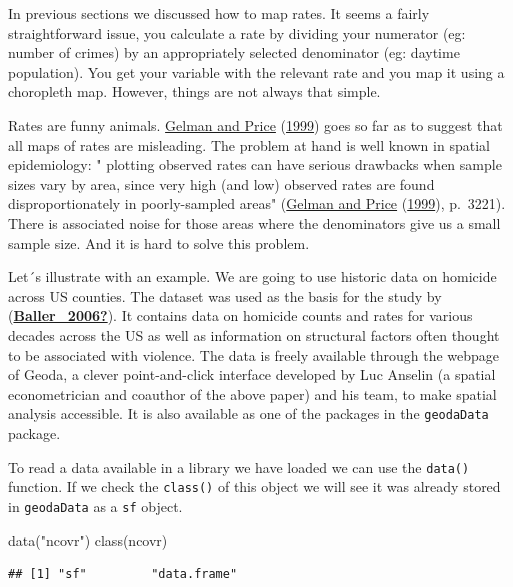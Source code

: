 \documentclass[
]{book}
\newenvironment{Shaded}{\begin{snugshade}}{\end{snugshade}}
\newcommand{\FunctionTok}[1]{\textcolor[rgb]{0.00,0.00,0.00}{#1}}
\newcommand{\NormalTok}[1]{#1}
\newcommand{\StringTok}[1]{\textcolor[rgb]{0.31,0.60,0.02}{#1}}
\begin{document}
In previous sections we discussed how to map rates. It seems a fairly straightforward issue, you calculate a rate by dividing your numerator (eg: number of crimes) by an appropriately selected denominator (eg: daytime population). You get your variable with the relevant rate and you map it using a choropleth map. However, things are not always that simple.

Rates are funny animals. \protect\hyperlink{ref-Gelman_1999}{Gelman and Price} (\protect\hyperlink{ref-Gelman_1999}{1999}) goes so far as to suggest that all maps of rates are misleading. The problem at hand is well known in spatial epidemiology: " plotting observed rates can have serious drawbacks when sample sizes vary by area, since very high (and low) observed rates are found disproportionately in poorly-sampled areas" (\protect\hyperlink{ref-Gelman_1999}{Gelman and Price} (\protect\hyperlink{ref-Gelman_1999}{1999}), p.~3221). There is associated noise for those areas where the denominators give us a small sample size. And it is hard to solve this problem.

Let´s illustrate with an example. We are going to use historic data on homicide across US counties. The dataset was used as the basis for the study by (\protect\hyperlink{ref-Baller_2006}{\textbf{Baller\_2006?}}). It contains data on homicide counts and rates for various decades across the US as well as information on structural factors often thought to be associated with violence. The data is freely available through the webpage of Geoda, a clever point-and-click interface developed by Luc Anselin (a spatial econometrician and coauthor of the above paper) and his team, to make spatial analysis accessible. It is also available as one of the packages in the \texttt{geodaData} package.

To read a data available in a library we have loaded we can use the \texttt{data()} function. If we check the \texttt{class()} of this object we will see it was already stored in \texttt{geodaData} as a \texttt{sf} object.

\begin{Shaded}
\begin{Highlighting}[]
\FunctionTok{data}\NormalTok{(}\StringTok{"ncovr"}\NormalTok{)}
\FunctionTok{class}\NormalTok{(ncovr)}
\end{Highlighting}
\end{Shaded}

\begin{verbatim}
## [1] "sf"         "data.frame"
\end{verbatim}
\end{document}
